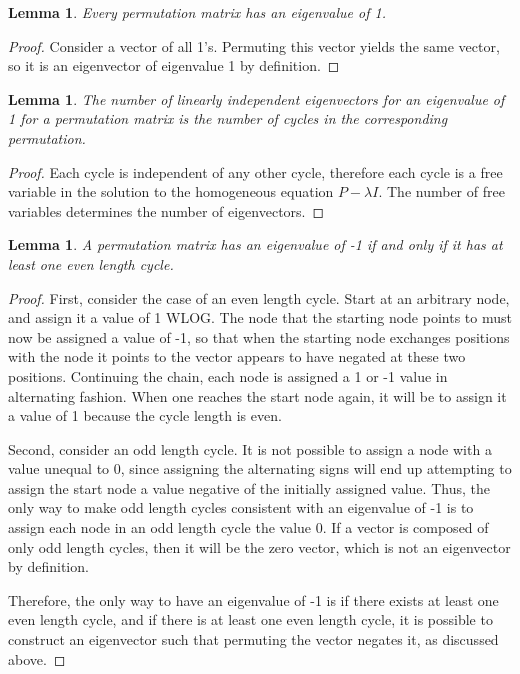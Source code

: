 \documentclass[11pt, oneside]{article}
\theoremstyle{plain}
\newtheorem{lemma}[theorem]{Lemma}
\theoremstyle{definition}
\begin{document}
\begin{lemma}
Every permutation matrix has an eigenvalue of 1.
\end{lemma}

\begin{proof}
Consider a vector of all 1's. Permuting this vector yields the same vector,
so it is an eigenvector of eigenvalue 1 by definition.
\end{proof}

\begin{lemma}
The number of linearly independent eigenvectors for an eigenvalue of 1 for a permutation matrix
is the number of cycles in the corresponding permutation.
\end{lemma}

\begin{proof}
Each cycle is independent of any other cycle, therefore each cycle
is a free variable in the solution to the homogeneous equation \( P - \lambda I \).
The number of free variables determines the number of eigenvectors.
\end{proof}

\begin{lemma}
A permutation matrix has an eigenvalue of -1 if and only if it has at least one even length cycle.
\end{lemma}
\begin{proof}
First, consider the case of an even length cycle. Start at an arbitrary node,
and assign it a value of 1 WLOG. The node that the starting node points to must
now be assigned a value of -1, so that when the starting node exchanges positions
with the node it points to the vector appears to have negated at these two positions.
Continuing the chain, each node is assigned a 1 or -1 value in alternating fashion.
When one reaches the start node again, it will be to assign it a value of 1
because the cycle length is even.

Second, consider an odd length cycle. It is not possible to assign a node
with a value unequal to 0, since assigning the alternating signs will end up
attempting to assign the start node a value negative
of the initially assigned value. Thus, the only way to make odd length cycles
consistent with an eigenvalue of -1 is to assign each node in an odd length
cycle the value 0. If a vector is composed of only odd length cycles, then it will be
the zero vector, which is not an eigenvector by definition.

Therefore, the only way to have an eigenvalue of -1 is if there exists at least
one even length cycle, and if there is at least one even length cycle,
it is possible to construct an eigenvector such that permuting the vector
negates it, as discussed above.
\end{proof}
\end{document}
